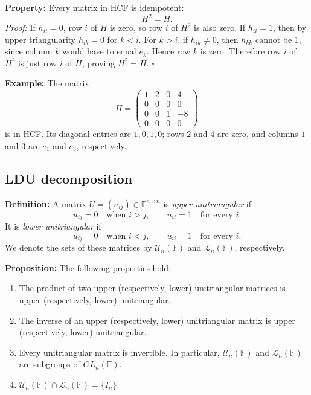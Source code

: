 \documentclass[a4paper,11pt,abstract=true]{scrartcl}
\theoremstyle{dotlessP}
\theoremstyle{dotlessS}
\theoremstyle{remark}
\theoremstyle{definition}
\begin{document}
\begin{claim_box}
\textbf{Property:} Every matrix in HCF is idempotent:
\[
H^2=H.
\]
\textit{Proof:} If $h_{ii}=0$, row $i$ of $H$ is zero, so row $i$ of
$H^2$ is also zero. If $h_{ii}=1$, then by upper triangularity
$h_{ik}=0$ for $k<i$. For $k>i$, if $h_{ik}\neq0$, then $h_{kk}$
cannot be $1$, since column $k$ would have to equal $e_k$. Hence row
$k$ is zero. Therefore row $i$ of $H^2$ is just row $i$ of $H$,
proving $H^2=H$. \hfill$\square$
\end{claim_box}

\begin{example_box}
\textbf{Example:} The matrix
\[
H=\begin{pmatrix}
1&2&0&4\\
0&0&0&0\\
0&0&1&-8\\
0&0&0&0
\end{pmatrix}
\]
is in HCF. Its diagonal entries are $1,0,1,0$; rows $2$ and $4$ are
zero, and columns $1$ and $3$ are $e_1$ and $e_3$, respectively.
\end{example_box}

\subsection{LDU decomposition}

\begin{definition_box}
\textbf{Definition:} A matrix $U=(u_{ij})\in\mathbb{F}^{n\times n}$
is \emph{upper unitriangular} if
\[
u_{ij}=0\quad\text{when }i>j,
\qquad
u_{ii}=1\quad\text{for every }i.
\]
It is \emph{lower unitriangular} if
\[
u_{ij}=0\quad\text{when }i<j,
\qquad
u_{ii}=1\quad\text{for every }i.
\]
We denote the sets of these matrices by $\mathcal{U}_n(\mathbb{F})$
and $\mathcal{L}_n(\mathbb{F})$, respectively.
\end{definition_box}

\begin{problem_box}
\textbf{Proposition:} The following properties hold:
\begin{enumerate}
    \item The product of two upper (respectively, lower) unitriangular
    matrices is upper (respectively, lower) unitriangular.
    \item The inverse of an upper (respectively, lower) unitriangular
    matrix is upper (respectively, lower) unitriangular.
    \item Every unitriangular matrix is invertible. In particular,
    $\mathcal{U}_n(\mathbb{F})$ and $\mathcal{L}_n(\mathbb{F})$ are
    subgroups of $GL_n(\mathbb{F})$.
    \item $\mathcal{U}_n(\mathbb{F})\cap\mathcal{L}_n(\mathbb{F})=\{I_n\}$.
\end{enumerate}
\end{problem_box}
\end{document}
